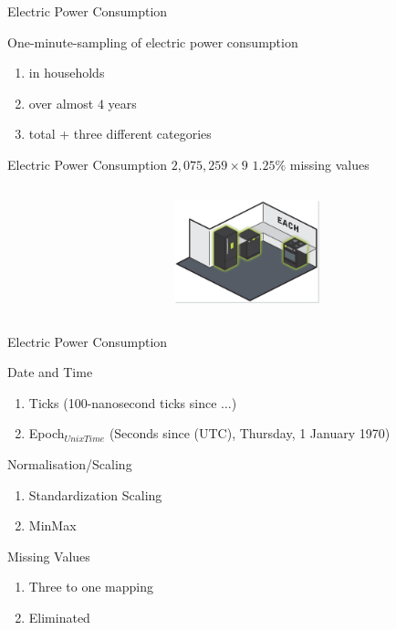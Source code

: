 \begin{frame}{Electric Power Consumption}


\bi
\mi One-minute-sampling of electric power consumption  
\begin{enumerate}
    \item in households
    \item over almost $4$ years
    \item total + three different categories 

  \end{enumerate}
\mi Electric Power Consumption
\mi $2,075,259\times9$
\mi $1.25\%$ missing values
\ei
\begin{columns}[t] %
     \begin{column}[T]{7cm} %
     
     \end{column}
     \begin{column}[T]{5cm} %
          \includegraphics[height=3cm]{fig/each.jpg}
     \end{column}
 \end{columns}

\end{frame}

\begin{frame}{Electric Power Consumption}

\begin{tcolorbox}[colback=LightSteelBlue!5,colframe=yellow!40!black,title=Preprocessing]

\bi
\mi Date and Time
\begin{enumerate}
    \item Ticks {\tiny (100-nanosecond ticks since $\ldots$)}
    \item Epoch$_{Unix Time}$ {\tiny (Seconds since (UTC), Thursday, 1
    January 1970) }
  \end{enumerate}
\mi Normalisation/Scaling
\begin{enumerate}
    \item Standardization Scaling
    \item MinMax 
  \end{enumerate}
  
  \mi Missing Values
\begin{enumerate}
    \item Three to one mapping 
    \item Eliminated
  \end{enumerate}
\ei


\end{tcolorbox}
\end{frame}

